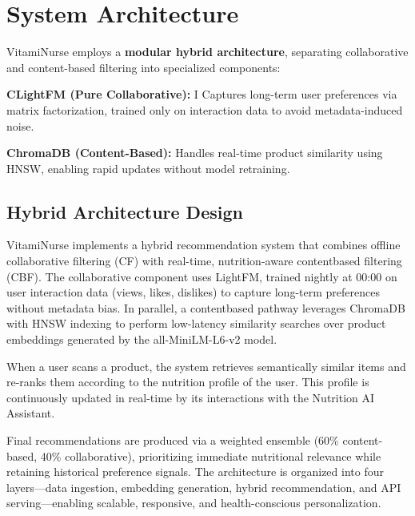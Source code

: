 \section{System Architecture}
VitamiNurse employs a \textbf{modular hybrid architecture}, separating
collaborative and content-based filtering into specialized components:

\item \textbf{CLightFM (Pure Collaborative):} I Captures long-term user preferences via matrix factorization, trained only on interaction data to avoid metadata-induced noise.
\item \textbf{ChromaDB (Content-Based):}  Handles real-time product similarity using HNSW, enabling rapid updates without model retraining.
\subsection{Hybrid Architecture Design}
VitamiNurse implements a hybrid recommendation system that combines
offline collaborative filtering (CF) with real-time, nutrition-aware contentbased filtering (CBF). The collaborative component uses LightFM, trained
nightly at 00:00 on user interaction data (views, likes, dislikes) to capture
long-term preferences without metadata bias. In parallel, a contentbased pathway leverages ChromaDB with HNSW indexing to perform
low-latency similarity searches over product embeddings generated by
the all-MiniLM-L6-v2 model.

When a user scans a product, the system retrieves semantically similar
items and re-ranks them according to the nutrition profile of the user.
This profile is continuously updated in real-time by its interactions with
the Nutrition AI Assistant.

Final recommendations are produced via a weighted ensemble (60\%
content-based, 40\% collaborative), prioritizing immediate nutritional
relevance while retaining historical preference signals. The architecture is
organized into four layers—data ingestion, embedding generation, hybrid
recommendation, and API serving—enabling scalable, responsive, and
health-conscious personalization.

